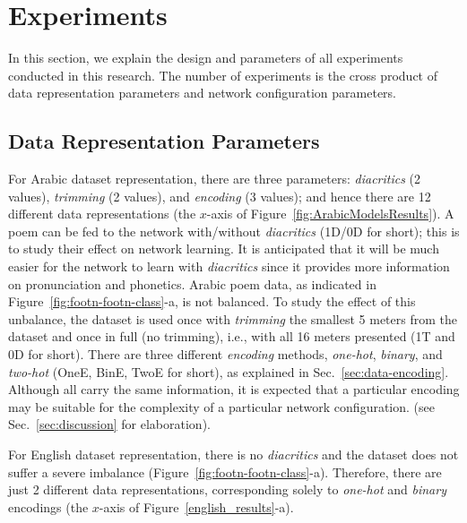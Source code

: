 \section{Experiments}\label{sec:model}
In this section, we explain the design and parameters of all experiments conducted in this
research. The number of experiments is the cross product of data representation parameters and
network configuration parameters.


\subsection{Data Representation Parameters}\label{sec:param-data-repr-1}
For Arabic dataset representation, there are three parameters: \textit{diacritics} (2 values),
\textit{trimming} (2 values), and \textit{encoding} (3 values); and hence there are 12 different
data representations (the $x$-axis of Figure~\ref{fig:ArabicModelsResults}). A poem can be fed to the
network with/without \textit{diacritics} (1D/0D for short); this is to study their effect on
network learning. It is anticipated that it will be much easier for the network to learn with
\textit{diacritics} since it provides more information on pronunciation and phonetics. Arabic poem
data, as indicated in Figure~\ref{fig:footn-footn-class}-a, is not balanced. To study the effect of
this unbalance, the dataset is used once with \textit{trimming} the smallest 5 meters from the
dataset and once in full (no trimming), i.e., with all 16 meters presented (1T and 0D for
short). There are three different \textit{encoding} methods, \textit{one-hot}, \textit{binary}, and
\textit{two-hot} (OneE, BinE, TwoE for short), as explained in
Sec.~\ref{sec:data-encoding}. Although all carry the same information, it is expected that a
particular encoding may be suitable for the complexity of a particular network configuration. (see
Sec.~\ref{sec:discussion} for elaboration).

For English dataset representation, there is no \textit{diacritics} and the dataset does not suffer
a severe imbalance (Figure~\ref{fig:footn-footn-class}-a). Therefore, there are just 2 different
data representations, corresponding solely to \textit{one-hot} and \textit{binary} encodings (the
$x$-axis of Figure~\ref{english_results}-a).


